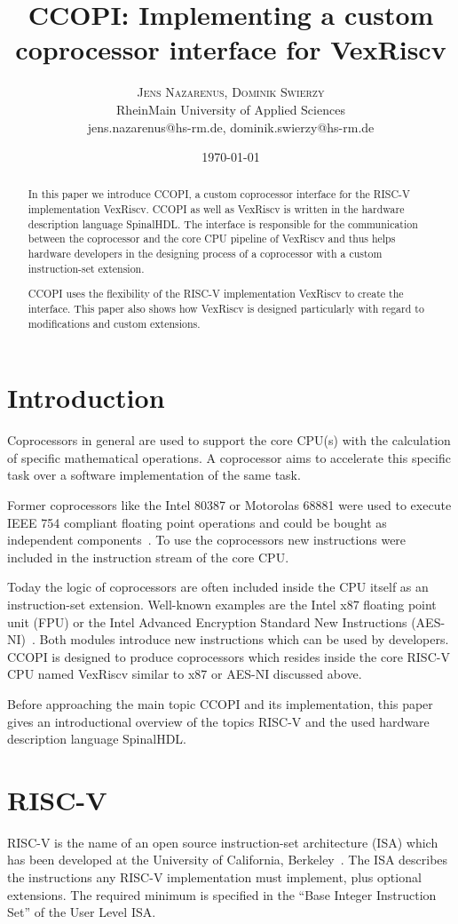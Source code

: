 \documentclass[twoside,twocolumn]{article}
\title{\vspace{-7mm}%
	\fontsize{24pt}{10pt}\selectfont
	\textbf{CCOPI: Implementing a custom coprocessor interface for
    VexRiscv}
	}
\author{%
	\large
	\textsc{Jens Nazarenus, Dominik Swierzy} \\[2mm]
	\normalsize	RheinMain University of Applied Sciences \\
    \normalsize	jens.nazarenus@hs-rm.de, dominik.swierzy@hs-rm.de
	}
\date{\today}
\begin{document}
\maketitle

\begin{abstract}
\noindent In this paper we introduce CCOPI, a custom coprocessor interface for the
RISC-V implementation VexRiscv. CCOPI as well as VexRiscv is written in
the hardware description language SpinalHDL. The interface is responsible 
for the communication between the coprocessor and the core CPU pipeline of 
VexRiscv and thus helps hardware developers in the designing process of 
a coprocessor with a custom instruction-set extension.

CCOPI uses the flexibility of the RISC-V implementation VexRiscv to create 
the interface. This paper also shows how VexRiscv is designed particularly with 
regard to modifications and custom extensions. 
\end{abstract}

\section{Introduction}
Coprocessors in general are used to support the core CPU(s) with the
calculation of specific mathematical operations. A coprocessor aims to
accelerate this specific task over a software implementation of the same
task.

Former coprocessors like the Intel 80387 or Motorolas 68881 were used to
execute IEEE 754 compliant floating point operations and could be
bought as independent components~\cite{motorola, intel198780387}. To use the coprocessors new
instructions were included in the instruction stream of the core CPU.

Today the logic of coprocessors are often included inside the CPU
itself as an instruction-set extension. Well-known examples are the
Intel\textregistered{} x87 
floating point unit (FPU) or the Intel\textregistered{} Advanced Encryption Standard New 
Instructions (AES-NI)~\cite{x87, aesni}. Both modules introduce new instructions which can
be used by developers.
CCOPI is designed to produce coprocessors which resides inside the core
RISC-V CPU named VexRiscv similar to x87 or AES-NI discussed above.

Before approaching the main topic CCOPI and its implementation, this paper
gives an introductional overview of the topics RISC-V and the used
hardware description language SpinalHDL.
\section{RISC-V}
RISC-V is the name of an open source instruction-set architecture (ISA)
which has been developed at the University of California,
Berkeley~\cite{riscv}.
The ISA describes the instructions any RISC-V implementation must
implement, plus optional extensions. The required minimum is specified in
the ``Base Integer Instruction Set'' of the User Level ISA.
\end{document}

